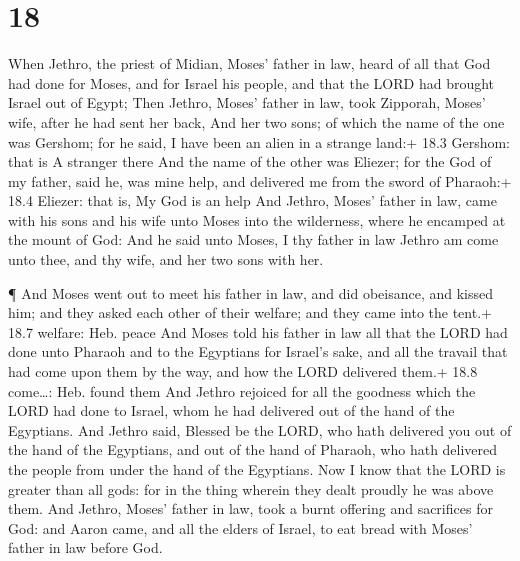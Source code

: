 \hypertarget{section-17}{%
\section{18}\label{section-17}}

 When Jethro, the priest of Midian, Moses' father in law,
heard of all that God had done for Moses, and for Israel his people, and
that the LORD had brought Israel out of Egypt;  Then Jethro,
Moses' father in law, took Zipporah, Moses' wife, after he had sent her
back,  And her two sons; of which the name of the one was
Gershom; for he said, I have been an alien in a strange land:+ 18.3
Gershom: that is A stranger there  And the name of the other
was Eliezer; for the God of my father, said he, was mine help, and
delivered me from the sword of Pharaoh:+ 18.4 Eliezer: that is, My God
is an help  And Jethro, Moses' father in law, came with his
sons and his wife unto Moses into the wilderness, where he encamped at
the mount of God:  And he said unto Moses, I thy father in
law Jethro am come unto thee, and thy wife, and her two sons with her.

 ¶ And Moses went out to meet his father in law, and did
obeisance, and kissed him; and they asked each other of their welfare;
and they came into the tent.+ 18.7 welfare: Heb. peace  And
Moses told his father in law all that the LORD had done unto Pharaoh and
to the Egyptians for Israel's sake, and all the travail that had come
upon them by the way, and how the LORD delivered them.+ 18.8 come\ldots:
Heb. found them  And Jethro rejoiced for all the goodness
which the LORD had done to Israel, whom he had delivered out of the hand
of the Egyptians.  And Jethro said, Blessed be the LORD,
who hath delivered you out of the hand of the Egyptians, and out of the
hand of Pharaoh, who hath delivered the people from under the hand of
the Egyptians.  Now I know that the LORD is greater than
all gods: for in the thing wherein they dealt proudly he was above them.
 And Jethro, Moses' father in law, took a burnt offering
and sacrifices for God: and Aaron came, and all the elders of Israel, to
eat bread with Moses' father in law before God.

